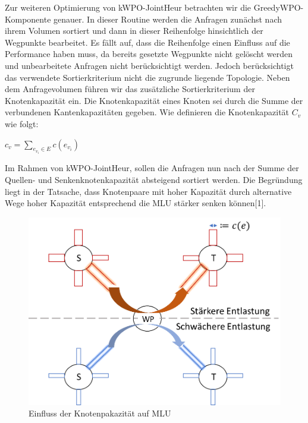 \documentclass[sigconf,noacm,review]{acmart}
\begin{document}
Zur weiteren Optimierung von kWPO-JointHeur betrachten wir die GreedyWPO-Komponente genauer. In dieser Routine werden die Anfragen zunächst nach ihrem Volumen sortiert und dann in dieser Reihenfolge hinsichtlich der Wegpunkte bearbeitet. Es fällt auf, dass die Reihenfolge einen Einfluss auf die Performance haben muss, da bereits gesetzte Wegpunkte nicht gelöscht werden und unbearbeitete Anfragen nicht berücksichtigt werden. Jedoch berücksichtigt das verwendete Sortierkriterium nicht die zugrunde liegende Topologie.
Neben dem Anfragevolumen führen wir das zusätzliche Sortierkriterium der Knotenkapazität ein. Die Knotenkapazität eines Knoten sei durch die Summe der verbundenen Kantenkapazitäten gegeben.
Wie definieren die Knotenkapazität $C_v$ wie folgt: \begin{center} $c_v = \sum_{e_{v_{i}} \in E} c(e_{v_i})$\end{center}
Im Rahmen von kWPO-JointHeur, sollen die Anfragen nun nach der Summe der Quellen- und Senkenknotenkapazität absteigend sortiert werden. Die Begründung liegt in der Tatsache, dass Knotenpaare mit hoher Kapazität durch alternative Wege hoher Kapazität entsprechend die MLU stärker senken können[1]. \\
\begin{figure}[h]
  \centering 
  \includegraphics[width=\linewidth]{abbildungen/kWPO_Capacity.png}
  \caption{Einfluss der Knotenpakazität auf MLU}
 \end{figure}
\end{document}
